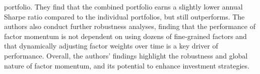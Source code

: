 \documentclass{article}
\begin{document}
portfolio. They find that the combined portfolio earns a slightly lower annual Sharpe ratio compared to the individual portfolios, but still outperforms. The authors also conduct further robustness analyses, finding that the performance of factor momentum is not dependent on using dozens of fine-grained factors and that dynamically adjusting factor weights over time is a key driver of performance. Overall, the authors' findings highlight the robustness and global nature of factor momentum, and its potential to enhance investment strategies. 
\end{document}
